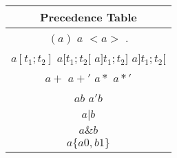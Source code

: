 \begin{tabular}{ |c| }
    \hline
    \textbf{Precedence Table} \\
    \hline
    $(a)$ \quad
    $a$ \quad
    $<a>$ \quad
    $.$ \\
    \hline
    $a[t_1;t_2]$ \quad
    $a[t_1;t_2[$ \quad
    $a]t_1;t_2]$ \quad
    $a]t_1;t_2[$ \\
    \hline
    $a+$ \quad
    $a+'$ \quad
    $a*$ \quad
    $a*'$ \\
    \hline
    $ab$ \quad
    $a'b$ \\
    \hline
    $a|b$ \\
    \hline
    $a\&b$ \\
    \hline
    $a\{a0,b1\}$ \\
    \hline
\end{tabular}